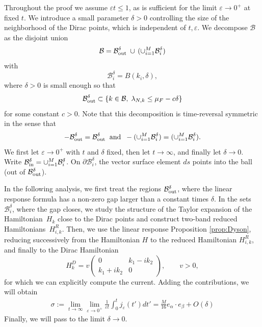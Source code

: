 \documentclass[a4paper,11pt]{article}
\theoremstyle{plain}
\theoremstyle{remark}
\def\eps{{\varepsilon}}
\begin{document}
\medskip

Throughout the proof we assume $\eps t\le1$, as is sufficient for the
limit $\eps\to0^+$ at fixed $t$. We introduce a small parameter $\delta>0$ controlling the size of the
neighborhood of the Dirac points, which is independent of
$t,\eps$. We decompose $\mathcal B$ as the disjoint union
\begin{align*}
  \mathcal B=\mathcal B_{\rm out}^{\delta}\; \cup  \, (\cup_{i=1}^M \mathcal B_{i}^{\delta})
\end{align*}
with
\[ \mathcal B_i^\delta= B(k_{i}, \delta),\]
where $\delta > 0$ is small enough so that
\[\mathcal B_{\rm out}^{\delta}\subset \{k\in\mathcal B,\;
  \lambda_{N,k} \leq \mu_F-c\delta\}\]
  for some constant $c>0$.
Note that this decomposition is time-reversal
symmetric in the sense that
\[
  -\mathcal B_{\rm out}^{\delta} = \mathcal
B_{\rm out}^{\delta}\;\; \mbox{and}\;\;
  - (\cup_{i=1}^M \mathcal B_{i}^{\delta}) = (\cup_{i=1}^M \mathcal B_{i}^{\delta}).
\]
We first let $\eps\to0^+$ with $t$ and $\delta$ fixed, then
let $t\to\infty$, and finally let $\delta\to0$.
Write $\mathcal B_{\rm in}^\delta=\cup_{i=1}^M\mathcal B_i^\delta$.
On $\partial\mathcal B_i^\delta$, the vector surface element $ds$ points
into the ball (out of $\mathcal B_{\rm out}^\delta$).

\medskip

In the following analysis, we first treat the regions
$\mathcal B_{\rm out}^{\delta}$, where the linear response formula
has a non-zero gap larger than a constant times $\delta$. In the sets
$\mathcal B_{i}^{\delta}$, where the gap closes, we study the structure of the Taylor expansion of the Hamiltonian~$H_k$ close to the Dirac points  and construct  two-band reduced Hamiltonians~$H_{i,k}^{R}$. Then, we use the linear
response Proposition \ref{prop:Dyson}, reducing successively from the
Hamiltonian $H$ to the reduced Hamiltonian
$H_{i,k}^{R}$,
 and finally to the
Dirac Hamiltonian
\[H_k^{D} = v\begin{pmatrix} 0 & k_1-ik_2 \\ k_1+ik_2 & 0\end{pmatrix},\qquad v>0,\]
for which we can explicitly
compute the current. Adding the contributions, we will obtain
\begin{align*}
\sigma:=  \lim_{t \to \infty} \lim_{\eps \to 0^+}\frac 1 {\eps t} \int_{0}^{t} j_\eps(t') dt' = \frac {M} {16}e_\alpha \cdot e_\beta  + O(\delta)
\end{align*}
Finally, we will pass to the limit $\delta \to 0$.
\end{document}
